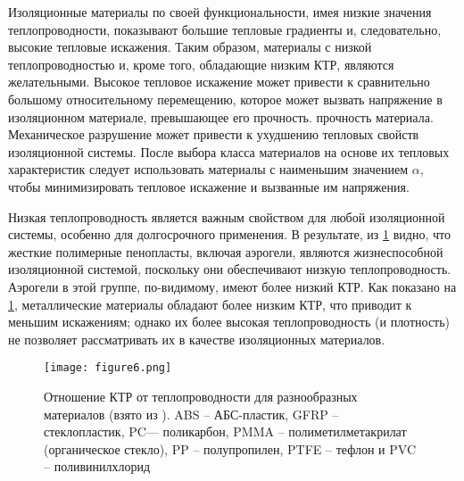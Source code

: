 Изоляционные материалы по своей функциональности, имея низкие значения теплопроводности, показывают большие тепловые градиенты и, следовательно, высокие тепловые искажения.  Таким образом, материалы с низкой теплопроводностью и, кроме того, обладающие низким КТР, являются желательными. Высокое тепловое искажение может привести к сравнительно большому относительному перемещению, которое может вызвать напряжение в изоляционном материале, превышающее его прочность. прочность материала. Механическое разрушение может привести к ухудшению тепловых свойств изоляционной системы. После выбора класса материалов на основе их тепловых характеристик следует использовать материалы с наименьшим значением \(\alpha\), чтобы минимизировать тепловое искажение и вызванные им напряжения.

Низкая теплопроводность является важным свойством для любой изоляционной системы, особенно для долгосрочного применения. В результате, из \cref{fig:figure6} видно, что жесткие полимерные пенопласты, включая аэрогели, являются жизнеспособной изоляционной системой, поскольку они обеспечивают низкую теплопроводность. Аэрогели в этой группе, по-видимому, имеют более низкий КТР. Как показано на \cref{fig:figure6}, металлические материалы обладают более низким КТР, что приводит к меньшим искажениям; однако их более высокая теплопроводность (и плотность) не позволяет рассматривать их в качестве изоляционных материалов.

\begin{figure}[h!]
\centering
\texttt{[image: figure6.png]}%
\caption{Отношение КТР от теплопроводности для разнообразных материалов  (взято из \cite{ashby2005}). ABS -- АБС-пластик, GFRP -- стеклопластик, PC--- поликарбон, PMMA -- полиметилметакрилат (органическое стекло), PP -- полупропилен, PTFE -- тефлон и PVC -- поливинилхлорид}
\label{fig:figure6}
\end{figure}

